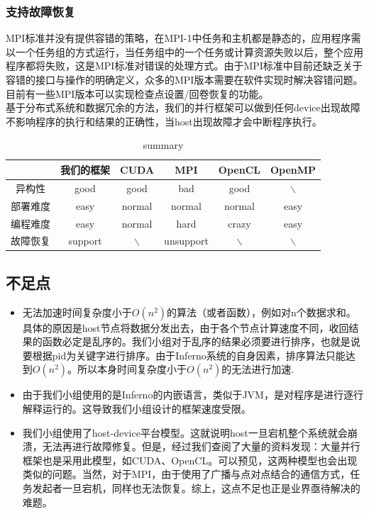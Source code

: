 \documentclass[paper=a4]{ctexart} %
\numberwithin{equation}{section} %
\numberwithin{figure}{section} %
\numberwithin{table}{section} %
\newcommand{\n}{\\\indent}
\begin{document}
\subsubsection{支持故障恢复}
    MPI标准并没有提供容错的策略，在MPI-1中任务和主机都是静态的，应用程序需以一个任务组的方式运行，当任务组中的一个任务或计算资源失败以后，整个应用程序都将失败，这是MPI标准对错误的处理方式。由于MPI标准中目前还缺乏关于容错的接口与操作的明确定义，众多的MPI版本需要在软件实现时解决容错问题。目前有一些MPI版本可以实现检查点设置/回卷恢复的功能。\n
    基于分布式系统和数据冗余的方法，我们的并行框架可以做到任何device出现故障不影响程序的执行和结果的正确性，当host出现故障才会中断程序执行。

\begin{table}[h]
  \footnotesize
  \large
  \caption{summary}
  \begin{tabular}{|c|c|c|c|c|c|} 
    \hline
    ~ & 我们的框架 & CUDA & MPI & OpenCL & OpenMP \\\hline
    异构性 & good & good & bad & good & $\backslash$ \\\hline
    部署难度 & easy & normal & normal & normal & easy \\\hline
    编程难度 & easy & normal & hard & crazy & easy \\\hline
    故障恢复 & support & $\backslash$ & unsupport & $\backslash$ & $\backslash$ \\\hline
    \end{tabular}
\end{table}

\subsection{不足点}
\begin{itemize}
\item 无法加速时间复杂度小于$O(n^2)$的算法（或者函数），例如对n个数据求和。具体的原因是host节点将数据分发出去，由于各个节点计算速度不同，收回结果的函数必定是乱序的。我们小组对于乱序的结果必须要进行排序，也就是说要根据pid为关键字进行排序。由于Inferno系统的自身因素，排序算法只能达到$O(n^2)$。所以本身时间复杂度小于$O(n^2)$的无法进行加速.
\item 由于我们小组使用的是Inferno的内嵌语言，类似于JVM，是对程序是进行逐行解释运行的。这导致我们小组设计的框架速度受限。
\item 我们小组使用了host-device平台模型。这就说明host一旦宕机整个系统就会崩溃，无法再进行故障修复。但是，经过我们查阅了大量的资料发现：大量并行框架也是采用此模型，如CUDA、OpenCL。可以预见，这两种模型也会出现类似的问题。当然，对于MPI，由于使用了广播与点对点结合的通信方式，任务发起者一旦宕机，同样也无法恢复。综上，这点不足也正是业界亟待解决的难题。
\end{itemize}
\end{document}
